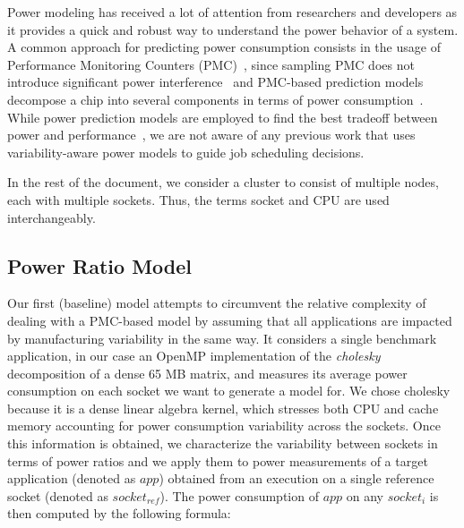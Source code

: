 Power modeling has received a lot of attention from researchers and developers as it provides a quick and robust way to understand the power behavior of a system.  
A common approach for predicting power consumption consists in the usage of 
Performance Monitoring Counters (PMC)~\cite{Bertran:2010:DRP:1810085.1810108,Singh:2009:RTP:1577129.1577137,Bellosa:2000:BED:566726.566736,4211032,Bircher:2005:RIM:1077603.1077668,Li:2003:RME:781027.781048},
since sampling PMC does not introduce significant power interference~\cite{Joseph:2001:RPE:383082.383119,Isci:2003:RPM:956417.956567}
and PMC-based prediction models decompose a chip into several components in terms of power consumption~\cite{Bertran:2010:DRP:1810085.1810108}.
While power prediction models are employed to find the best tradeoff between power and performance~\cite{Gholkar:2016:PTH:2967938.2967961},
we are not aware of any previous work that uses variability-aware power models to guide job scheduling decisions.  

In the rest of the document, we consider a cluster to consist of multiple nodes, each with multiple sockets. Thus, the terms socket and CPU are used interchangeably.

\subsection{Power Ratio Model}
\label{sec:naive_model}

Our first (baseline) model attempts to circumvent the relative complexity of dealing with a PMC-based model by assuming that all applications are impacted by manufacturing variability in the same way.  
It considers a single benchmark application, in our case an OpenMP implementation of the \textit{cholesky} decomposition of a dense 65 MB matrix, 
and measures its average power consumption on each socket we want to generate a model for.
We chose cholesky because it is a dense linear algebra kernel, which stresses both CPU and cache memory accounting for power consumption variability across the sockets.
Once this information is obtained, we characterize the variability between sockets in terms of power ratios and we apply them to power measurements of a target application (denoted as $app$) obtained from an execution on a single reference socket (denoted as $socket_{ref}$).
The power consumption of $app$ on any $socket_i$ is then computed by the following formula:

